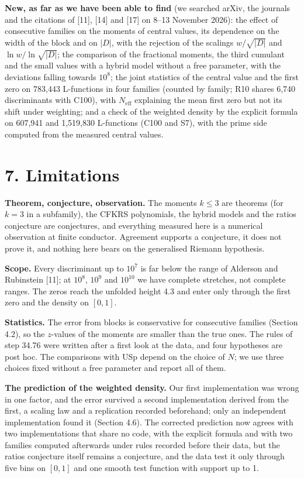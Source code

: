 \documentclass[
  10pt,
]{article}
\begin{document}
\textbf{New, as far as we have been able to find} (we searched arXiv,
the journals and the citations of {[}11{]}, {[}14{]} and {[}17{]} on
8--13 November 2026): the effect of consecutive families on the moments
of central values, its dependence on the width of the block and on
\(|D|\), with the rejection of the scalings \(w/\sqrt{|D|}\) and
\(\ln w/\ln\sqrt{|D|}\); the comparison of the fractional moments, the
third cumulant and the small values with a hybrid model without a free
parameter, with the deviations falling towards \(10^8\); the joint
statistics of the central value and the first zero on 783,443
L-functions in four families (counted by family; R10 shares 6,740
discriminants with C100), with \(N_{\mathrm{eff}}\) explaining the mean
first zero but not its shift under weighting; and a check of the
weighted density by the explicit formula on 607,941 and 1,519,830
L-functions (C100 and S7), with the prime side computed from the
measured central values.

\hypertarget{limitations}{%
\section{7. Limitations}\label{limitations}}

\textbf{Theorem, conjecture, observation.} The moments \(k \le 3\) are
theorems (for \(k = 3\) in a subfamily), the CFKRS polynomials, the
hybrid models and the ratios conjecture are conjectures, and everything
measured here is a numerical observation at finite conductor. Agreement
supports a conjecture, it does not prove it, and nothing here bears on
the generalised Riemann hypothesis.

\textbf{Scope.} Every discriminant up to \(10^7\) is far below the range
of Alderson and Rubinstein {[}11{]}; at \(10^8\), \(10^9\) and
\(10^{10}\) we have complete stretches, not complete ranges. The zeros
reach the unfolded height 4.3 and enter only through the first zero and
the density on \([0, 1]\).

\textbf{Statistics.} The error from blocks is conservative for
consecutive families (Section 4.2), so the \(z\)-values of the moments
are smaller than the true ones. The rules of step 34.76 were written
after a first look at the data, and four hypotheses are post hoc. The
comparisons with USp depend on the choice of \(N\); we use three choices
fixed without a free parameter and report all of them.

\textbf{The prediction of the weighted density.} Our first
implementation was wrong in one factor, and the error survived a second
implementation derived from the first, a scaling law and a replication
recorded beforehand; only an independent implementation found it
(Section 4.6). The corrected prediction now agrees with two
implementations that share no code, with the explicit formula and with
two families computed afterwards under rules recorded before their data,
but the ratios conjecture itself remains a conjecture, and the data test
it only through five bins on \([0, 1]\) and one smooth test function
with support up to 1.
\end{document}
